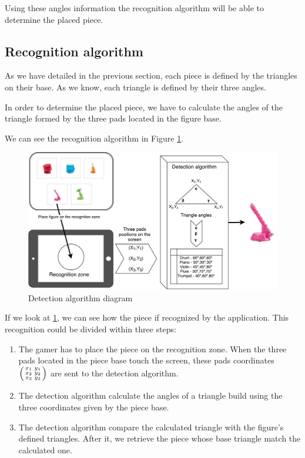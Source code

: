 Using these angles information the recognition algorithm will be able to determine the placed piece.

\newpage
\subsection{Recognition algorithm}
\label{sec:recognitionalgorithm}
As we have detailed in the previous section, each piece is defined by the triangles on their base. As we know, each triangle is defined by their three angles.

In order to determine the placed piece, we have to calculate the angles of the triangle formed by the three pads located in the figure base.

We can see the recognition algorithm in Figure \ref{fig:detectionalgorithm}.

\begin{figure}[ht!]
	\centering
	\includegraphics[width=400pt]{graphics/architecture/DetectionAlgorithm.pdf}
	\caption{Detection algorithm diagram}
	\label{fig:detectionalgorithm}
\end{figure}

If we look at \ref{fig:detectionalgorithm}, we can see how the piece if recognized by the application. This recognition could be divided within three steps:

\begin{enumerate}
	\item The gamer has to place the piece on the recognition zone. When the three pads located in the piece base touch the screen, these pads coordinates $\Bigl(\begin{smallmatrix} x_1&y_1 \\ x_2&y_2 \\ x_3&y_3 \end{smallmatrix} \Bigr)$ are sent to the detection algorithm.
	\item The detection algorithm calculate the angles of a triangle build using the three coordinates given by the piece base.
	\item The detection algorithm compare the calculated triangle with the figure's defined triangles. After it, we retrieve the piece whose base triangle match the calculated one.
\end{enumerate}

